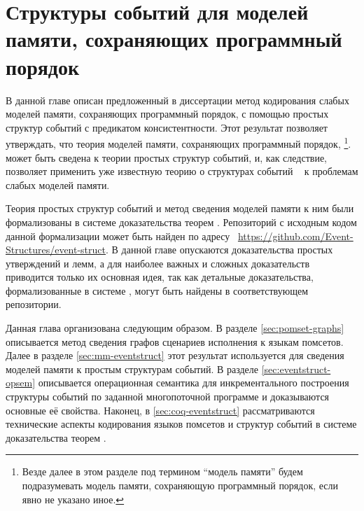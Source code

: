 \chapter{Структуры событий для моделей памяти, сохраняющих программный порядок}
\label{ch:porf-evenstruct}

В данной главе описан предложенный в диссертации метод 
кодирования слабых моделей памяти, сохраняющих программный порядок, 
с помощью простых структур событий с предикатом консистентности. 
Этот результат позволяет утверждать, что теория  
моделей памяти, сохраняющих программный порядок,%
\footnote{Везде далее в этом разделе 
под термином ``модель памяти'' будем подразумевать 
модель памяти, сохраняющую программный порядок, если явно не указано иное.}.
может быть сведена к теории простых структур событий, 
и, как следствие, позволяет применить уже известную теорию о структурах событий%
~\cite{Winskel:86,Vaandrager:TCS1991,Sassone:MFCS1993,Nielsen:REX93,Winskel-TCS:09}
к проблемам слабых моделей памяти.

Теория простых структур событий и метод сведения 
моделей памяти к ним были формализованы в системе 
доказательства теорем \coq.
Репозиторий с исходным кодом данной формализации
может быть найден по адресу~%
\url{https://github.com/Event-Structures/event-struct}.
В данной главе опускаются доказательства
простых утверждений и лемм, а для наиболее
важных и сложных доказательств приводится только их основная идея,
так как детальные доказательства, формализованные в системе \coq,
могут быть найдены в соответствующем репозитории.


Данная глава организована следующим образом. 
В разделе \ref{sec:pomset-graphs} описывается метод 
сведения графов сценариев исполнения к языкам помсетов. 
Далее в разделе \ref{sec:mm-eventstruct} этот результат 
используется для сведения моделей памяти к простым структурам событий. 
В разделе \ref{sec:eventstruct-opsem} описывается 
операционная семантика для инкрементального построения 
структуры событий по заданной многопоточной программе 
и доказываются основные её свойства. 
Наконец, в \ref{sec:coq-eventstruct} рассматриваются 
технические аспекты кодирования языков помсетов и структур событий 
в системе доказательства теорем \coq.

